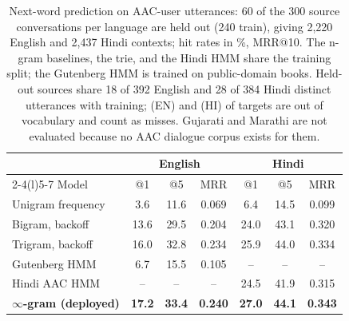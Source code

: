 \begin{table}[t]
\centering\footnotesize
\setlength{\tabcolsep}{3pt}
\begin{tabular}{@{}lcccccc@{}}
\toprule
 & \multicolumn{3}{c}{English} & \multicolumn{3}{c}{Hindi} \\
\cmidrule(lr){2-4}\cmidrule(l){5-7}
Model & @1 & @5 & MRR & @1 & @5 & MRR \\
\midrule
Unigram frequency & 3.6 & 11.6 & 0.069 & 6.4 & 14.5 & 0.099 \\
Bigram, backoff & 13.6 & 29.5 & 0.204 & 24.0 & 43.1 & 0.320 \\
Trigram, backoff & 16.0 & 32.8 & 0.234 & 25.9 & 44.0 & 0.334 \\
Gutenberg HMM & 6.7 & 15.5 & 0.105 & -- & -- & -- \\
Hindi AAC HMM & -- & -- & -- & 24.5 & 41.9 & 0.315 \\
\midrule
\rowcolor{rowtint}\textbf{$\infty$-gram (deployed)} & \textbf{17.2} & \textbf{33.4} & \textbf{0.240} & \textbf{27.0} & \textbf{44.1} & \textbf{0.343} \\
\bottomrule
\end{tabular}
\caption{Next-word prediction on AAC-user utterances: 60 of the 300 source conversations per language are held out (240 train), giving 2,220 English and 2,437 Hindi contexts; hit rates in \%, MRR@10. The n-gram baselines, the trie, and the Hindi HMM share the training split; the Gutenberg HMM is trained on public-domain books. Held-out sources share 18 of 392 English and 28 of 384 Hindi distinct utterances with training; \PredOOVEN{} (EN) and \PredOOVHI{} (HI) of targets are out of vocabulary and count as misses. Gujarati and Marathi are not evaluated because no AAC dialogue corpus exists for them.}
\label{tab:pred}
\end{table}
